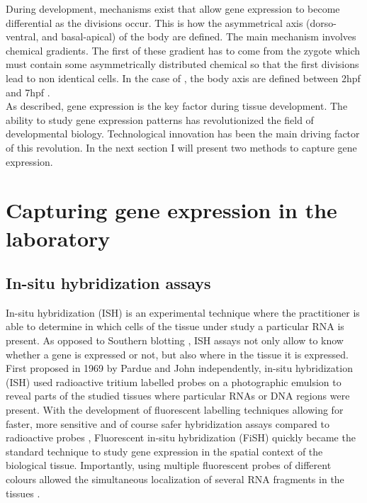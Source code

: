 	During development, mechanisms exist that allow gene expression to become differential as the divisions occur. This is how the asymmetrical axis (dorso-ventral, and basal-apical) of the body are defined. The main mechanism involves chemical gradients. The first of these gradient has to come from the zygote which must contain some asymmetrically distributed chemical so that the first divisions lead to non identical cells. In the case of \platyfull{}, the body axis are defined  between 2hpf and 7hpf \cite{Fischer10}.\\
	
	As described, gene expression is the key factor during tissue development. The ability to study gene expression patterns has revolutionized the field of developmental biology. Technological innovation has been the main driving factor of this revolution. In the next section I will present two methods to capture gene expression.


\section{Capturing gene expression in the laboratory}\label{sec:gene_expression_lab}
     \subsection{In-situ hybridization assays}
     In-situ hybridization (ISH) is an experimental technique where the practitioner is able to determine in which cells of the tissue under study a particular RNA is present. As opposed to Southern blotting \cite{southern75}, ISH assays not only allow to know whether a gene is expressed or not, but also where in the tissue it is expressed. First proposed in 1969 by Pardue \cite{pardue69} and John \cite{john69} independently, in-situ hybridization (ISH) used radioactive tritium labelled probes on a photographic emulsion to reveal parts of the studied tissues where particular RNAs or DNA regions were present. With the development of fluorescent labelling techniques \cite{landegent84,pinkel88} allowing for faster, more sensitive and of course safer hybridization assays compared to radioactive probes \cite{swiger96}, Fluorescent in-situ hybridization (FiSH) quickly became the standard technique to study gene expression in the spatial context of the biological tissue. Importantly, using multiple fluorescent probes of different colours allowed the simultaneous localization of several RNA fragments in the tissues \cite{nederlof89}.
     

